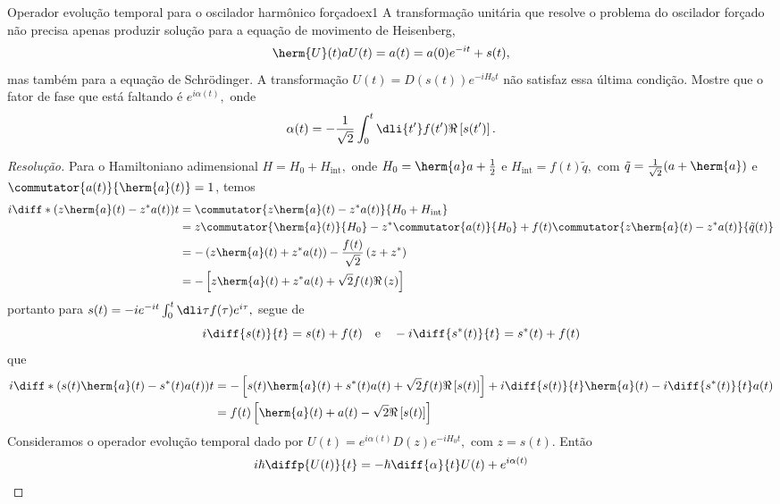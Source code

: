 \begin{exercício}{Operador evolução temporal para o oscilador harmônico forçado}{ex1}
   A transformação unitária que resolve o problema do oscilador forçado não precisa apenas produzir solução para a equação de movimento de Heisenberg,
   \begin{equation*}
      \herm{U}(t) a U(t) = a(t) = a(0) e^{-it} + s(t),
   \end{equation*}
   mas também para a equação de Schrödinger. A transformação \(U(t) = D(s(t)) e^{-i H_0 t}\) não satisfaz essa última condição. Mostre que o fator de fase que está faltando é \(e^{i \alpha(t)},\) onde
   \begin{equation*}
      \alpha(t) = - \frac{1}{\sqrt{2}} \int_0^t \dli{t'} f(t') \Re\left[s(t')\right].
   \end{equation*}
\end{exercício}
\begin{proof}[Resolução]
   Para o Hamiltoniano adimensional \(H = H_0 + H_{\mathrm{int}},\) onde \(H_0 = \herm{a}a + \frac12\) e \(H_{\mathrm{int}} = f(t)\tilde{q},\) com \(\tilde{q} = \frac1{\sqrt{2}} (a + \herm{a})\) e \(\commutator{a(t)}{\herm{a}(t)} = 1\), temos
   \begin{align*}
      i\diff*{\left(z \herm{a}(t) - z^* a(t)\right)}{t} &= \commutator{z \herm{a}(t) - z^* a(t)}{H_0 + H_\mathrm{int}}\\
                                                                   &= z \commutator{\herm{a}(t)}{H_0} - z^*\commutator{a(t)}{H_0} + f(t) \commutator{z\herm{a}(t) - z^*a(t)}{\tilde{q}(t)}\\
                                                                   &= -\left(z \herm{a}(t) + z^* a(t)\right) -\frac{f(t)}{\sqrt{2}}\left(z +z^*\right)\\
                                                                   &= - \left[z \herm{a}(t) + z^* a(t) + \sqrt{2} f(t) \Re\left(z\right)\right]
   \end{align*}
   portanto para \(s(t) = -i e^{-it} \int_0^t \dli\tau f(\tau) e^{i \tau},\) segue de
   \begin{equation*}
      i\diff{s(t)}{t} = s(t) + f(t)\quad\text{e}\quad -i\diff{s^*(t)}{t} = s^*(t) + f(t)
   \end{equation*}
   que
   \begin{align*}
      i \diff*{\left(s(t) \herm{a}(t) - s^*(t) a(t)\right)}{t} 
      &= - \left[s(t) \herm{a}(t) + s^*(t) a(t) + \sqrt{2} f(t) \Re\left[s(t)\right]\right]+ i \diff{s(t)}{t} \herm{a}(t) - i \diff{s^*(t)}{t} a(t)\\
      &= f(t) \left[\herm{a}(t) + a(t) - \sqrt{2} \Re\left[s(t)\right]\right]
   \end{align*}
   Consideramos o operador evolução temporal dado por \(U(t) = e^{i \alpha (t)} D(z) e^{-i H_0 t},\) com \(z = s(t).\) Então
   \begin{equation*}
      i \hbar \diffp{U(t)}{t} = - \hbar \diff{\alpha}{t} U(t) + e^{i \alpha(t)}
   \end{equation*}
\end{proof}
